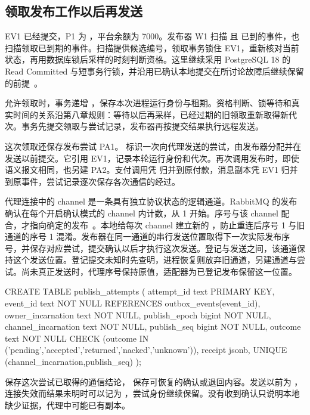 \subsection*{领取发布工作以后再发送}

EV1 已经提交，P1 为 ，平台余额为 7000。发布器 W1 扫描  且  已到的事件，也扫描领取已到期的事件。扫描提供候选编号，领取事务锁住 EV1，重新核对当前状态，再用数据库锁后采样的时刻判断资格。这里继续采用 PostgreSQL 18 的 Read Committed 与短事务行锁，并沿用已确认本地提交在所讨论故障后继续保留的前提~\cite{pg}。

允许领取时，事务递增 ，保存本次进程运行身份与租期。资格判断、锁等待和真实时间的关系沿第八章规则：等待以后再采样，已经过期的旧领取重新取得新代次。事务先提交领取与尝试记录，发布器再按提交结果执行远程发送。

这次领取还保存发布尝试 PA1。 标识一次向代理发送的尝试，由发布器分配并在发送以前提交。它引用 EV1，记录本轮运行身份和代次。再次调用发布时，即使语义报文相同，也另建 PA2。支付调用凭  归并到原付款，消息副本凭 EV1 归并到原事件，尝试记录逐次保存各次通信的经过。

代理连接中的 channel 是一条具有独立协议状态的逻辑通道。RabbitMQ 的发布确认在每个开启确认模式的 channel 内计数，从 1 开始。序号与该 channel 配合，才指向确定的发布~\cite{rabbitmq-confirms}。本地给每次 channel 建立新的 ，防止重连后序号 1 与旧通道的序号 1 混淆。发布器在同一通道的串行发送位置取得下一次实际发布序号，并保存对应尝试，提交确认以后才执行这次发送。登记与发送之间，该通道保持这个发送位置。登记提交未知时先查明，进程恢复则放弃旧通道，另建通道与尝试。尚未真正发送时，代理序号保持原值，适配器为已登记发布保留这一位置。

\begin{BookCode}
CREATE TABLE publish_attempts (
  attempt_id text PRIMARY KEY,
  event_id text NOT NULL REFERENCES outbox_events(event_id),
  owner_incarnation text NOT NULL,
  publish_epoch bigint NOT NULL,
  channel_incarnation text NOT NULL,
  publish_seq bigint NOT NULL,
  outcome text NOT NULL
    CHECK (outcome IN ('pending','accepted','returned','nacked','unknown')),
  receipt jsonb,
  UNIQUE (channel_incarnation,publish_seq)
);
\end{BookCode}

 保存这次尝试已取得的通信结论， 保存可恢复的确认或退回内容。发送以前为 ，连接失效而结果未明时可以记为 ，尝试身份继续保留。没有收到确认只说明本地缺少证据，代理中可能已有副本。

